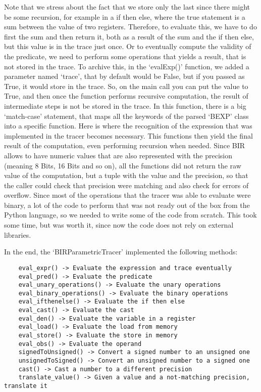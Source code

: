 Note that we stress about the fact that we store only the last since there might
be some recursion, for example in a if then else, where the true statement is a
sum between the value of two registers. Therefore, to evaluate this, we have to do
first the sum and then return it, both as a result of the sum and the if then
else, but this value is in the trace just once. Or to eventually compute the
validity of the predicate, we need to perform some operations that yields a result,
that is not stored in the trace. To archive this, in the `evalExp()' function, we
added a parameter named `trace', that by default would be False, but if you passed
as True, it would store in the trace. So, on the main call you can put the value
to True, and then once the function performs recursive computation, the result
of intermediate steps is not be stored in the trace. In this function, there is
a big `match-case' statement, that maps all the keywords of the parsed `BEXP' class
into a specific function. Here is where the recognition of the expression that
was implemented in the tracer becomes necessary. This functions then yield the final
result of the computation, even performing recursion when needed. Since BIR allows
to have numeric values that are also represented with the precision (meaning 8
Bits, 16 Bits and so on), all the functions did not return the raw value of the computation,
but a tuple with the value and the precision, so that the caller could check that
precision were matching and also check for errors of overflow. Since most of the
operations that the tracer was able to evaluate were binary, a lot of the code to
perform that was not ready out of the box from the Python language, so we needed
to write some of the code from scratch. This took some time, but was worth it, since
now the code does not rely on external libraries.

In the end, the `BIRParametricTracer' implemented the following methods: \begin{verbatim}
    eval_expr() -> Evaluate the expression and trace eventually
    eval_pred() -> Evaluate the predicate
    eval_unary_operations() -> Evaluate the unary operations 
    eval_binary_operations() -> Evaluate the binary operations
    eval_ifthenelse() -> Evaluate the if then else
    eval_cast() -> Evaluate the cast
    eval_den() -> Evaluate the variable in a register
    eval_load() -> Evaluate the load from memory
    eval_store() -> Evaluate the store in memory
    eval_obs() -> Evaluate the operand
    signedToUnsigned() -> Convert a signed number to an unsigned one
    unsignedToSigned() -> Convert an unsigned number to a signed one
    cast() -> Cast a number to a different precision
    translate_value() -> Given a value and a not-matching precision, translate it
\end{verbatim}

